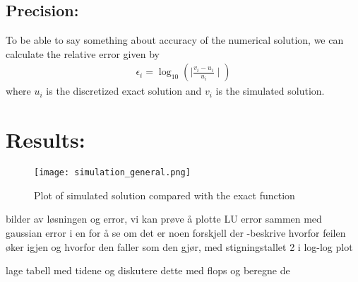 \documentclass[a4paper, 10pt]{article}
\begin{document}
\subsection{Precision:}
To be able to say something about accuracy of the numerical solution, we can
calculate the relative error given by
\begin{align*}
  \epsilon_{i} = \log_{10}\left(\mid \frac{v_{i}-u_{i}}{u_{i}} \mid \right)
\end{align*}
where \(u_{i}\) is the discretized exact solution and \(v_{i}\) is the
simulated solution.
\section{Results:}
\begin{figure}[H]
  \centering
  \texttt{[image: simulation\_general.png]}
  \caption{Plot of simulated solution compared with the exact function}
  \label{fig:Figure 1} 
\end{figure}



bilder av løsningen og error, vi kan prøve å plotte LU error sammen med
gaussian error i en for å se om det er noen forskjell der
-beskrive hvorfor feilen øker igjen og hvorfor den faller som den gjør, med
stigningstallet 2 i log-log plot

lage tabell med tidene og diskutere dette med flops og beregne de
\end{document}
